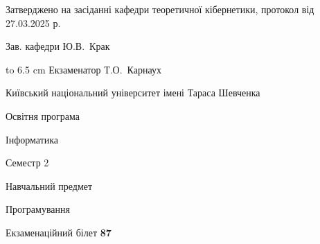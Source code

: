 \documentclass[12pt, ukrainian]{article}
\begin{document}
{\smallskip\smallskip \begin {scriptsize} Затверджено на засіданні кафедри теоретичної кібернетики, протокол   від   27.03.2025 р.\par\smallskip\smallskip\smallskip\smallskip
{\parbox {6.5 cm} {Зав. кафедри \dotfill Ю.В.~Крак}}\hspace {0.7cm} {\hbox to 6.5 cm { Екзаменатор \dotfill Т.О.~Карнаух}} \end{scriptsize}}
\newpage
{{\begin {scriptsize}\par
{ \center  Київський національний університет імені Тараса Шевченка \par}
{\parbox {5 cm}{Освітня програма \hfill}{\parbox {7 cm}{Інформатика\hfill}}\parbox {6 cm}{\hfill Семестр 2}}\par
{\parbox {5 cm} {Навчальний предмет \hfill}\parbox {7 cm}{Програмування \hfill}\parbox {6cm}{\hfill}\par}\vspace{-15pt} \end{scriptsize}}{\center Екзаменаційний білет \No \textbf { 87 }\par}}
\end{document}

